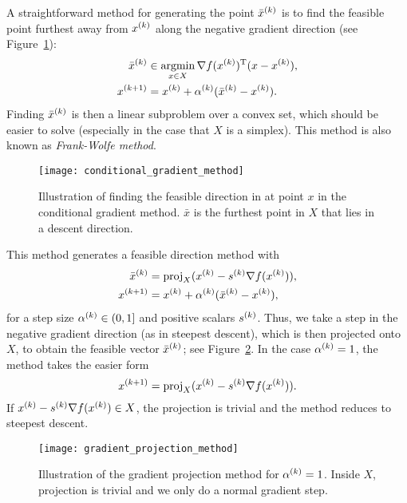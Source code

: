 \documentclass{article}
\begin{document}
\label{s:conditional-gradient-method}

A straightforward method for generating the point \(\kth{\bar{x}}\) is to find the feasible point
furthest away from \(\kth{x}\) along the negative gradient direction (see
Figure~\ref{fig:conditional-gradient-method}):
\begin{align*}
  \kth{\bar{x}} &\in \argmin_{x \in X} \T{\nabla f(\kth{x})}(x - \kth{x}), \\
  \kth[k+1]{x} &= \kth{x} + \kth{\alpha}(\kth{\bar{x}} - \kth{x}).
\end{align*}
Finding \(\kth{\bar{x}}\) is then a linear subproblem over a convex set, which should be easier to
solve (especially in the case that \(X\) is a simplex).  This method is also known as
\emph{Frank-Wolfe method}.

\begin{figure}[H]
  \centering
  \texttt{[image: conditional\_gradient\_method]}
  \caption{Illustration of finding the feasible direction in at point \(x\) in the conditional
    gradient method. \(\bar{x}\) is the furthest point in \(X\) that lies in a descent
    direction.\label{fig:conditional-gradient-method}}
\end{figure}

\label{s:gradient-projection-method}

This method generates a feasible direction method with
\begin{align*}
  \kth{\bar{x}} &= \proj_X (\kth{x} - \kth{s} \nabla f(\kth{x})), \\
  \kth[k+1]{x} &= \kth{x} + \kth{\alpha}(\kth{\bar{x}} - \kth{x}),
\end{align*}
for a step size \(\kth{\alpha} \in (0, 1]\) and positive scalars \(\kth{s}\).  Thus, we take a step
in the negative gradient direction (as in steepest descent), which is then projected onto \(X\), to
obtain the feasible vector \(\kth{\bar{x}}\); see Figure~\ref{fig:gradient-projection-method}.  In
the case \(\kth{\alpha} = 1\), the method takes the easier form
\begin{equation*}
  \kth[k+1]{x} = \proj_X (\kth{x} - \kth{s} \nabla f(\kth{x})).
\end{equation*}
If \(\kth{x} - \kth{s} \nabla f(\kth{x}) \in X\), the projection is trivial and the method reduces
to steepest descent.

\begin{figure}[H]
  \centering
  \texttt{[image: gradient\_projection\_method]}
  \caption{Illustration of the gradient projection method for \(\kth{\alpha} = 1\).  Inside \(X\),
    projection is trivial and we only do a normal gradient
    step.\label{fig:gradient-projection-method}}
\end{figure}
\end{document}
